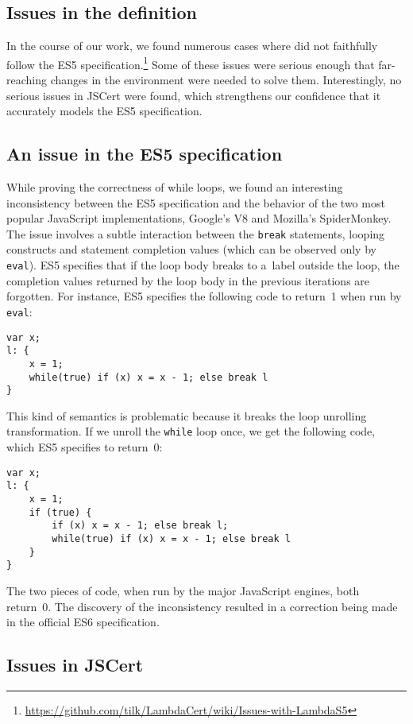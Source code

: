 \documentclass{llncs}
\newcommand{\jsinline}[1]{\texttt{#1}}
\begin{document}
\subsection{Issues in the \lambdajs definition}

In the course of our work, we found numerous cases where
\lambdajs did not faithfully follow the ES5 
specification.\footnote{\url{https://github.com/tilk/LambdaCert/wiki/Issues-with-LambdaS5}}
Some of these issues were serious enough that
far-reaching changes in the \lambdajs environment were needed
to solve them. Interestingly, no serious issues in JSCert were
found, which strengthens our confidence that it accurately models
the ES5 specification.

\subsection{An issue in the ES5 specification}

While proving the correctness of while loops, we found an interesting
inconsistency between the ES5 specification and the behavior
of the two most popular JavaScript implementations, Google's V8 and
Mozilla's SpiderMonkey. The issue involves a subtle interaction
between the \jsinline{break} statements, looping constructs
and statement completion values (which can be observed only by \jsinline{eval}).
ES5 specifies that if the loop body breaks to a~label outside the loop,
the completion values returned by the loop body in the previous iterations
are forgotten. For instance, ES5 specifies the following code to return~1 when run by \jsinline{eval}:
\begin{verbatim}
var x; 
l: { 
    x = 1; 
    while(true) if (x) x = x - 1; else break l 
}
\end{verbatim}
This kind of semantics is problematic because it breaks the loop unrolling
transformation. If we unroll the \jsinline{while} loop once, we get the
following code, which ES5 specifies to return~0:
\begin{verbatim}
var x; 
l: { 
    x = 1; 
    if (true) { 
        if (x) x = x - 1; else break l; 
        while(true) if (x) x = x - 1; else break l 
    }
}
\end{verbatim}
The two pieces of code, when run by the major JavaScript engines, both return~0.
The discovery of the inconsistency
resulted in a correction being made in the official ES6
specification\cite{esdiscuss:loop-unrolling}.

\subsection{Issues in JSCert}
\end{document}
